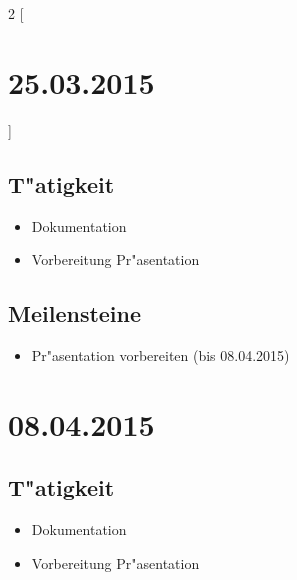 \documentclass[11pt,a4paper]{article}
\begin{document}
\begin{multicols}{2}
[\section*{  25.03.2015  }] 

\subsection*{T"atigkeit}
\begin{itemize}
\item Dokumentation
\item Vorbereitung Pr"asentation
\end{itemize}

\columnbreak

\subsection*{Meilensteine}

\begin{itemize}
\item Pr"asentation vorbereiten (bis 08.04.2015)
\end{itemize}

\end{multicols}


\section*{  08.04.2015  }

\subsection*{T"atigkeit}
\begin{itemize}
\item Dokumentation
\item Vorbereitung Pr"asentation
\end{itemize}
\end{document}
